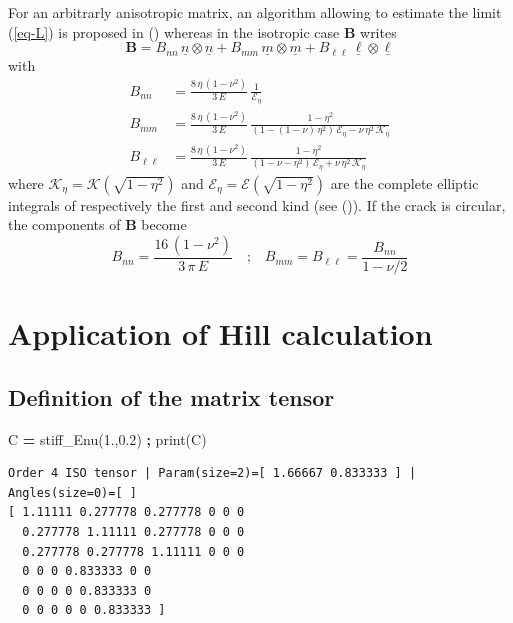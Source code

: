 \documentclass[
  a4paper,
  numbers=noendperiod,
  DIV=12]{scrreprt}
\newenvironment{Shaded}{\begin{snugshade}}{\end{snugshade}}
\newcommand{\BuiltInTok}[1]{#1}
\newcommand{\FloatTok}[1]{\textcolor[rgb]{0.00,0.00,0.81}{#1}}
\newcommand{\NormalTok}[1]{#1}
\newcommand{\OperatorTok}[1]{\textcolor[rgb]{0.81,0.36,0.00}{\textbf{#1}}}
\newcommand{\uu}[1]{{\symbf{{#1}}}}
\newcommand{\uv}[1]{{\underline{{#1}}}}
\begin{document}
For an arbitrarly anisotropic matrix, an algorithm allowing to estimate
the limit (\ref{eq-L}) is proposed in
() whereas in the
isotropic case \(\uu{B}\) writes \[
\uu{B}=
B_{nn}\,\uv{n}\otimes\uv{n}
+
B_{mm}\,\uv{m}\otimes\uv{m}
+
B_{\ell\ell}\,\uv{\ell}\otimes\uv{\ell}
\] with \[\begin{aligned}
B_{nn}&=\frac{8\,\eta\,(1-\nu^2)}{3\,E}\,
\frac{1}{\mathcal{E}_\eta}\label{eq:Bnn}\\
B_{mm}&=\frac{8\,\eta\,(1-\nu^2)}{3\,E}\,
\frac{1-\eta^2}{\left(1-(1-\nu)\,\eta^2\right)
\,\mathcal{E}_\eta-\nu\,\eta^2\,\mathcal{K}_\eta}\\
B_{\ell\ell}&=\frac{8\,\eta\,(1-\nu^2)}{3\,E}\,
\frac{1-\eta^2}{(1-\nu-\eta^2)\,\mathcal{E}_\eta+\nu\,\eta^2\,\mathcal{K}_\eta}
\end{aligned}\] where \(\mathcal{K}_\eta=\mathcal{K}(\sqrt{1-\eta^2})\)
and \(\mathcal{E}_\eta=\mathcal{E}(\sqrt{1-\eta^2})\) are the complete
elliptic integrals of respectively the first and second kind (see
()). If the
crack is circular, the components of \(\uu{B}\) become \[
B_{nn}=\frac{16\,(1-\nu^2)}{3\,\pi\,E}
\quad\textrm{;}\quad
B_{mm}=B_{\ell\ell}=\frac{B_{nn}}{1-\nu/2}
\]

\section{Application of Hill
calculation}\label{application-of-hill-calculation}

\subsection{Definition of the matrix
tensor}\label{definition-of-the-matrix-tensor}

\begin{Shaded}
\begin{Highlighting}[]
\NormalTok{C }\OperatorTok{=}\NormalTok{ stiff\_Enu(}\FloatTok{1.}\NormalTok{,}\FloatTok{0.2}\NormalTok{) }\OperatorTok{;} \BuiltInTok{print}\NormalTok{(C)}
\end{Highlighting}
\end{Shaded}

\begin{verbatim}
Order 4 ISO tensor | Param(size=2)=[ 1.66667 0.833333 ] | Angles(size=0)=[ ]
[ 1.11111 0.277778 0.277778 0 0 0 
  0.277778 1.11111 0.277778 0 0 0 
  0.277778 0.277778 1.11111 0 0 0 
  0 0 0 0.833333 0 0 
  0 0 0 0 0.833333 0 
  0 0 0 0 0 0.833333 ]
\end{verbatim}
\end{document}
